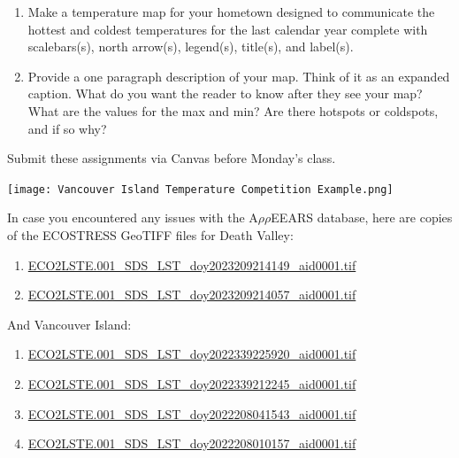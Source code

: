 \documentclass[oneside,a4paper,11pt,explicit]{book}
\begin{document}
\begin{tcolorbox}[colback=yellow!5!white,colframe=IceCreamOrbit,title= \vspace{.2em} \Large Map of the Week Assignments]
	\large
	\begin{enumerate}
		\item Make a temperature map for your hometown designed to communicate the hottest and coldest temperatures for the last calendar year complete with scalebars(s), north arrow(s), legend(s), title(s), and label(s). 
        \item Provide a one paragraph description of your map. Think of it as an expanded caption. What do you want the reader to know after they see your map? What are the values for the max and min? Are there hotspots or coldspots, and if so why?
	\end{enumerate}
	Submit these assignments via Canvas before Monday's class.
\end{tcolorbox}


\centerline{\texttt{[image: Vancouver Island Temperature Competition Example.png]}}

\begin{tcolorbox}[colback=yellow!5!white,title=\textbf{Datafiles}]
	\large
	In case you encountered any issues with the A$\rho\rho$EEARS database, here are copies of the ECOSTRESS GeoTIFF files for Death Valley:
	\begin{enumerate}
		\item \href{https://jeremydforsythe.github.io/icecream-tutorials/Tutorial2_AccessingRemoteSensingDataWithAppears/ECO2LSTE.001_SDS_LST_doy2023209214149_aid0001.tif}{ECO2LSTE.001\_SDS\_LST\_doy2023209214149\_aid0001.tif}
		\item \href{https://jeremydforsythe.github.io/icecream-tutorials/Tutorial2_AccessingRemoteSensingDataWithAppears/ECO2LSTE.001_SDS_LST_doy2023209214057_aid0001.tif}{ECO2LSTE.001\_SDS\_LST\_doy2023209214057\_aid0001.tif}
	\end{enumerate}
	And Vancouver Island:
	\begin{enumerate}
		\item \href{https://jeremydforsythe.github.io/icecream-tutorials/Tutorial5_AddingElementsToMaps/ECO2LSTE.001_SDS_LST_doy2022339225920_aid0001.tif}{ECO2LSTE.001\_SDS\_LST\_doy2022339225920\_aid0001.tif}
		\item \href{https://jeremydforsythe.github.io/icecream-tutorials/Tutorial5_AddingElementsToMaps/ECO2LSTE.001_SDS_LST_doy2022339212245_aid0001.tif}{ECO2LSTE.001\_SDS\_LST\_doy2022339212245\_aid0001.tif}
		\item \href{https://jeremydforsythe.github.io/icecream-tutorials/Tutorial5_AddingElementsToMaps/ECO2LSTE.001_SDS_LST_doy2022208041543_aid0001.tif}{ECO2LSTE.001\_SDS\_LST\_doy2022208041543\_aid0001.tif}
		\item \href{https://jeremydforsythe.github.io/icecream-tutorials/Tutorial5_AddingElementsToMaps/ECO2LSTE.001_SDS_LST_doy2022208010157_aid0001.tif}{ECO2LSTE.001\_SDS\_LST\_doy2022208010157\_aid0001.tif}
	\end{enumerate}
\end{tcolorbox}
\end{document}
